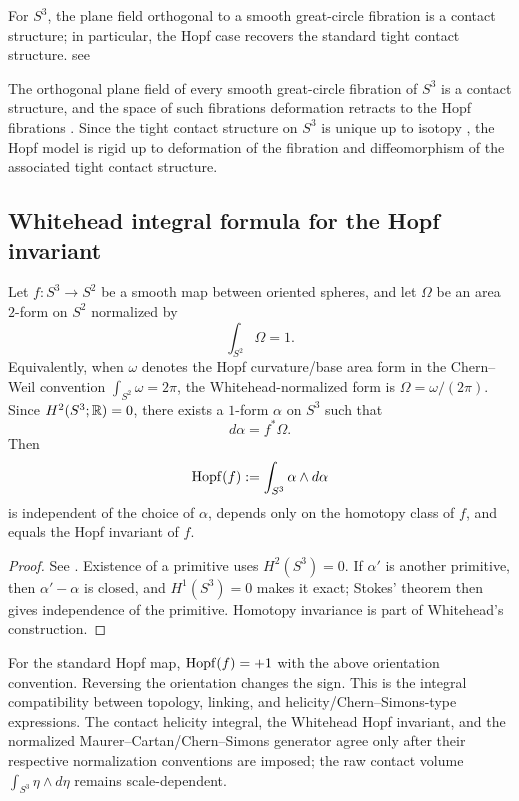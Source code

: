 \documentclass[11pt]{article}
\begin{document}
\begin{remark}
For \(S^3\), the plane field orthogonal to a smooth great-circle fibration is a
contact structure; in particular, the Hopf case recovers the standard tight contact
structure.
see \cite{Gluck2022}
\end{remark}

\begin{remark}
\label{p1:rem:great-circle-contact-rigidity}
The orthogonal plane field of every smooth great-circle fibration of \(S^3\) is
a contact structure, and the space of such fibrations deformation retracts to
the Hopf fibrations \cite{Gluck2022}.  Since the tight contact structure on
\(S^3\) is unique up to isotopy
\cite{Eliashberg1992TightS3}, the Hopf model is
rigid up to deformation of the fibration and diffeomorphism of the associated
tight contact structure.
\end{remark}


\subsection{Whitehead integral formula for the Hopf invariant}
\label{p1:der:whitehead-hopf}

\begin{theorem}
\label{p1:thm:whitehead-integral-formula}
Let \(f:S^3\to S^2\) be a smooth map between oriented spheres, and let \(\Omega\) be an area \(2\)-form on
\(S^2\) normalized by
\[
\int_{S^2}\Omega = 1.
\]
Equivalently, when \(\omega\) denotes the Hopf curvature/base area form in the
Chern--Weil convention \(\int_{S^2}\omega=2\pi\), the Whitehead-normalized form is
\(\Omega=\omega/(2\pi)\).
Since \(H^2(S^3;\mathbb{R})=0\), there exists a \(1\)-form \(\alpha\) on \(S^3\) such that
\[
d\alpha = f^*\Omega.
\]
Then
\[
\operatorname{Hopf}(f):=\int_{S^3}\alpha\wedge d\alpha
\]
is independent of the choice of \(\alpha\), depends only on the homotopy class of
\(f\), and equals the Hopf invariant of \(f\).
\end{theorem}

\begin{proof}
See \cite{Whitehead1947}. Existence of a primitive uses \(H^2(S^3)=0\). If
\(\alpha'\) is another primitive, then \(\alpha'-\alpha\) is closed, and
\(H^1(S^3)=0\) makes it exact; Stokes' theorem then gives independence of the
primitive. Homotopy invariance is part of Whitehead's construction.
\end{proof}

\begin{remark}
For the standard Hopf map, \(\operatorname{Hopf}(f)=+1\) with the above orientation convention.  Reversing the orientation changes the sign. This is
the integral compatibility between topology, linking, and helicity/Chern--Simons-type
expressions.  The contact helicity integral, the Whitehead Hopf invariant, and the normalized Maurer--Cartan/Chern--Simons generator agree only after their respective normalization conventions are imposed; the raw contact volume \(\int_{S^3}\eta\wedge d\eta\) remains scale-dependent.
\end{remark}
\end{document}
